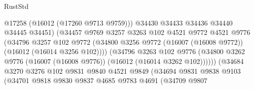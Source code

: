\begin{lexlean}{RustStd}
\begin{coremodule}
                                        @17258
                                        (@16012 (@17260 @9713 @9759)))
                                      @34430
                                      @34433
                                      @34436
                                      @34440
                                      @34445
                                      @34451)
                                    (@34457
                                      @9769
                                      @3257
                                      @3263
                                      @102
                                      @4521
                                      @9772
                                      @4521
                                      @9776
                                      (@34796
                                        @3257
                                        @102
                                        @9772
                                        (@34800
                                          @3256
                                          @9772
                                          (@16007 (@16008 @9772))
                                          (@16012 (@16014 @3256 @102))))
                                      (@34796
                                        @3263
                                        @102
                                        @9776
                                        (@34800
                                          @3262
                                          @9776
                                          (@16007 (@16008 @9776))
                                          (@16012 (@16014 @3262 @102))))))
                                  (@34684
                                    @3270
                                    @3276
                                    @102
                                    @9831
                                    @9840
                                    @4521
                                    @9849
                                    (@34694
                                      @9831
                                      @9838
                                      @9103
                                      (@34701
                                        @9818
                                        @9830
                                        @9837
                                        @4685
                                        @9783
                                        @4691
                                        (@34709
                                          @9807

\end{coremodule}
\end{lexlean}

